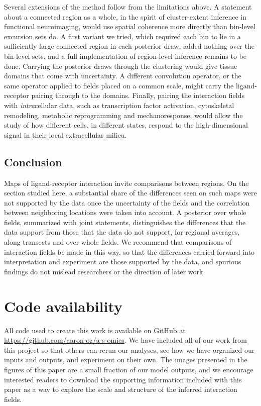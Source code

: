 \documentclass[10pt,letterpaper]{article}
\begin{document}
Several extensions of the method follow from the limitations above. A statement about a connected region as a whole, in the spirit of cluster-extent inference in functional neuroimaging, would use spatial coherence more directly than bin-level excursion sets do. A first variant we tried, which required each bin to lie in a sufficiently large connected region in each posterior draw, added nothing over the bin-level sets, and a full implementation of region-level inference remains to be done. Carrying the posterior draws through the clustering would give tissue domains that come with uncertainty. A different convolution operator, or the same operator applied to fields placed on a common scale, might carry the ligand-receptor pairing through to the domains. Finally, pairing the interaction fields with \textit{intra}cellular data, such as transcription factor activation, cytoskeletal remodeling, metabolic reprogramming and mechanoresponse, would allow the study of how different cells, in different states, respond to the high-dimensional signal in their local extracellular milieu.

\subsection*{Conclusion}

Maps of ligand-receptor interaction invite comparisons between regions. On the section studied here, a substantial share of the differences seen on such maps were not supported by the data once the uncertainty of the fields and the correlation between neighboring locations were taken into account. A posterior over whole fields, summarized with joint statements, distinguishes the differences that the data support from those that the data do not support, for regional averages, along transects and over whole fields. We recommend that comparisons of interaction fields be made in this way, so that the differences carried forward into interpretation and experiment are those supported by the data, and spurious findings do not mislead researchers or the direction of later work.

\section*{Code availability}\label{sec:code}

All code used to create this work is available on GitHub at \url{https://github.com/aaron-oz/a-s-omics}. We have included all of our work from this project so that others can rerun our analyses, see how we have organized our inputs and outputs, and experiment on their own. The images presented in the figures of this paper are a small fraction of our model outputs, and we encourage interested readers to download the supporting information included with this paper as a way to explore the scale and structure of the inferred interaction fields.
\end{document}
